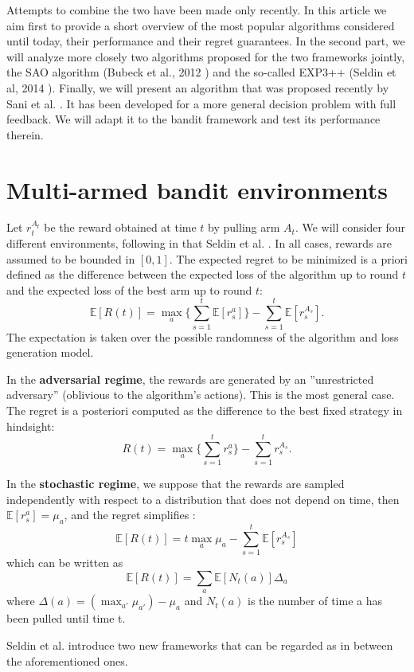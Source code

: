 \documentclass[11pt]{article}
\begin{document}
Attempts to combine the two have been made only recently. In this article we aim first to provide a short overview of the most popular algorithms considered until today, their performance and their regret guarantees. In the second part, we will analyze more closely two algorithms proposed for the two frameworks jointly, the SAO algorithm (Bubeck et al., 2012 \cite{Bube12}) and the so-called EXP3++ (Seldin et al, 2014 \cite{Seld14}). Finally, we will present an algorithm that was proposed recently by Sani et al. \cite{Sani14}. It has been developed for a more general decision problem with full feedback. We will adapt it to the bandit framework and test its performance therein.

\section*{Multi-armed bandit environments}
Let $r_{t}^{A_{t}}$ be the reward obtained at time $t$ by pulling arm $A_{t}$. We will consider four different environments, following in that Seldin et al. \cite{Seld14}. In all cases, rewards are assumed to be bounded in $[0,1]$. The expected regret to be minimized is a priori defined as the difference between the expected loss of the algorithm up to round $t$ and the expected loss of the best arm up to round $t$:
$$\mathbb{E}[R(t)]=\max_{a}\{ \sum_{s=1}^{t} \mathbb{E}[r_{s}^{a}]\}-\sum_{s=1}^{t} \mathbb{E}[r_{s}^{A_{s}}].$$
The expectation is taken over the possible randomness of the algorithm and loss generation model. 

In the \textbf{adversarial regime}, the rewards are generated by an ''unrestricted adversary'' (oblivious to the algorithm's actions). This is the most general case. The regret is a posteriori computed as the difference to the best fixed strategy in hindsight: 
$$ R(t)=\max_{a}\{ \sum_{s=1}^{t} r_{s}^{a} \}-\sum_{s=1}^{t} r_{s}^{A_{s}}.$$

In the \textbf{stochastic regime}, we suppose that the rewards are sampled independently with respect to a distribution that does not depend on time, then $\mathbb{E}[r_{s}^{a}]=\mu_{a}$, and the regret simplifies : 
$$\mathbb{E}[R(t)]=t\max_{a}\mu_{a}-\sum_{s=1}^{t} \mathbb{E}[r_{s}^{A_{s}}]$$
which can be written as
$$\mathbb{E}[R(t)]=\sum_{a}\mathbb{E}[N_{t}(a)]\Delta_{a}$$ 
where $\Delta(a)=(\max_{a'}\mu_{a'})-\mu_{a}$ and $N_{t}(a)$ is the number of time a has been pulled until time t.

Seldin et al. introduce two new frameworks that can be regarded as in between the aforementioned ones.
\end{document}
